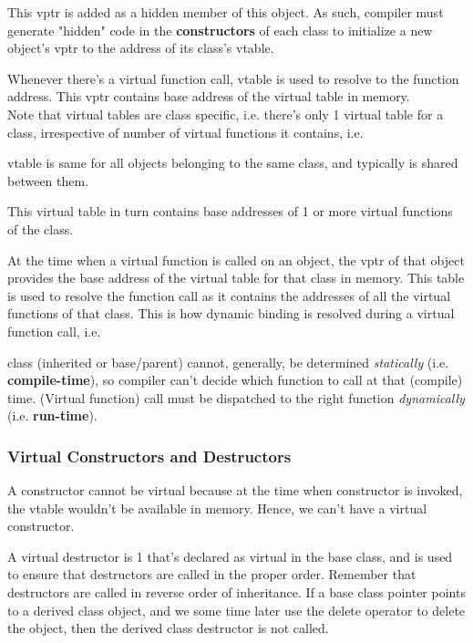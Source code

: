 \documentclass[10pt]{amsart}
\begin{document}
This vptr is added as a hidden member of this object.  As such, compiler must generate "hidden" code in the \textbf{constructors} of each class to initialize a new object's vptr to the address of its class's vtable.  


Whenever there's a virtual function call, vtable is used to resolve to the function address.  
This vptr contains base address of the virtual table in memory.  \\

Note that virtual tables are class specific, i.e. there's only 1 virtual table for a class, irrespective of number of virtual functions it contains, i.e.  

vtable is same for all objects belonging to the same class, and typically is shared between them.    
  

This virtual table in turn contains base addresses of 1 or more virtual functions of the class.  

At the time when a virtual function is called on an object, the vptr of that object provides the base address of the virtual table for that class in memory.  This table is used to resolve the function call as it contains the addresses of all the virtual functions of that class.  This is how dynamic binding is resolved during a virtual function call, i.e.  

class (inherited or base/parent) cannot, generally, be determined \emph{statically} (i.e. \textbf{compile-time}), so compiler can't decide which function to call at that (compile) time.  (Virtual function) call must be dispatched to the right function \emph{dynamically} (i.e. \textbf{run-time}).  



\subsubsection{Virtual Constructors and Destructors}  

A constructor cannot be virtual because at the time when constructor is invoked, the vtable wouldn't be available in memory.  Hence, we can't have a virtual constructor.  

A virtual destructor is 1 that's declared as virtual in the base class, and is used to ensure that destructors are called in the proper order.  Remember that destructors are called in reverse order of inheritance.  If a base class pointer points to a derived class object, and we some time later use the delete operator to delete the object, then the derived class destructor is not called.  
\end{document}
